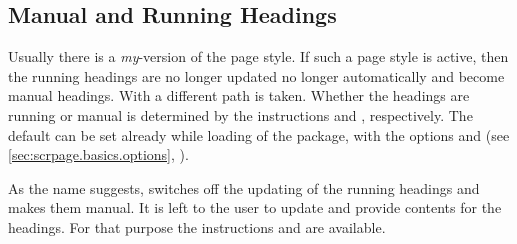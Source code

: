 \subsection{Manual and Running Headings}
%
%
%
%
Usually there is a \emph{my}-version of the 
page style.  If such a page style is active, then the running headings
are no longer updated no longer automatically and become manual
headings.  With  a different path is taken. Whether
the headings are running or manual is determined by the instructions
 and , respectively.  The default
can be set already while loading of the package, with the options
 and  (see
\autoref{sec:scrpage.basics.options},
).


\begin{Declaration}
\end{Declaration}%
%
As the name suggests,  switches off the updating of
the running headings and makes them manual. It is left to the user to
update and provide contents for the headings.  For that purpose the
instructions  and
 are available.%
%


